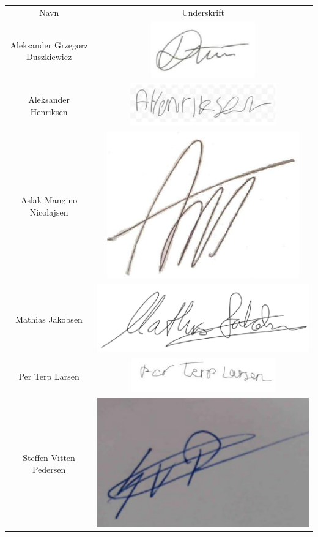 \begin{center}
\begin{longtable}{cc}
Navn & Underskrift \\
Aleksander Grzegorz Duszkiewicz & \includegraphics[width = 5 cm]{./PNG/underskrifter/Aleksander_D.PNG}\\ 
Aleksander Henriksen & \includegraphics[width = 5 cm]{./PNG/underskrifter/Aleksander_H.PNG}\\
Aslak Mangino Nicolajsen & \includegraphics[width = 5 cm]{./PNG/underskrifter/Aslak.PNG} \\
Mathias Jakobsen & \includegraphics[width = 5 cm]{./PNG/underskrifter/Mathias.PNG} \\ 
Per Terp Larsen  &  \includegraphics[width = 5 cm]{./PNG/underskrifter/Per.PNG} \\
Steffen Vitten Pedersen & \includegraphics[width = 5 cm]{./PNG/underskrifter/Steffen.PNG}  \\
\end{longtable}
\end{center}


